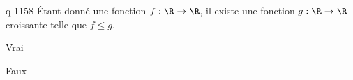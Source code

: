 \begin{truefalse}{q-1158}
Étant donné une fonction $f : \R \to \R$, il existe une fonction $g : \R \to \R$ croissante telle que $f \leq g$.
\item Vrai
\item* Faux
\end{truefalse}

